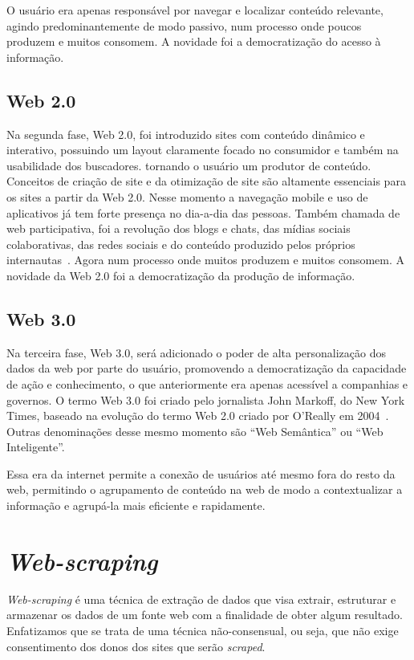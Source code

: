 O usuário era apenas responsável por navegar e localizar conteúdo relevante, agindo predominantemente de modo passivo, num processo onde poucos produzem e muitos consomem.
A novidade foi a democratização do acesso à informação.

\subsection{Web 2.0}

Na segunda fase, Web 2.0, foi introduzido sites com conteúdo dinâmico e interativo, possuindo um layout claramente focado no consumidor e também na usabilidade dos buscadores. tornando o usuário um produtor de conteúdo.
Conceitos de criação de site e da otimização de site são altamente essenciais para os sites a partir da Web 2.0.
Nesse momento a navegação mobile e uso de aplicativos já tem forte presença no dia-a-dia das pessoas.
Também chamada de web participativa, foi a revolução dos blogs e chats, das mídias sociais colaborativas, das redes sociais e do conteúdo produzido pelos próprios internautas~\cite{Web32}.
Agora num processo onde muitos produzem e muitos consomem.
A novidade da Web 2.0 foi a democratização da produção de informação.

\subsection{Web 3.0}

Na terceira fase, Web 3.0, será adicionado o poder de alta personalização dos dados da web por parte do usuário, promovendo a democratização da capacidade de ação e conhecimento, o que anteriormente era apenas acessível a companhias e governos.
O termo Web 3.0 foi criado pelo jornalista John Markoff, do New York Times, baseado na evolução do termo Web 2.0 criado por O’Really em 2004~\cite{Web32}. Outras denominações desse mesmo momento são ``Web Semântica'' ou ``Web Inteligente''.

Essa era da internet permite a conexão de usuários até mesmo fora do resto da web, permitindo o agrupamento de conteúdo na web de modo a contextualizar a informação e agrupá-la mais eficiente e rapidamente.

\section{\textit{Web-scraping}}

\textit{Web-scraping} é uma técnica de extração de dados que visa extrair, estruturar e armazenar os dados de um fonte web com a finalidade de obter algum resultado.
Enfatizamos que se trata de uma técnica não-consensual, ou seja, que não exige consentimento dos donos dos sites que serão \textit{scraped}.


